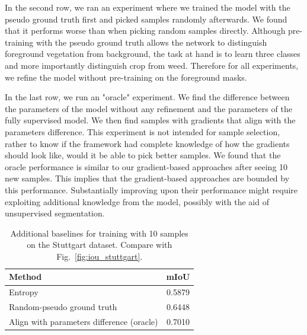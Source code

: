 \documentclass[letterpaper, 10 pt, conference]{ieeeconf}  %
\def\figref#1{Fig.~\ref{#1}}
\newcommand\todo[1]{\textbf{[TODO: #1}]}
\begin{document}

In the second row, we ran an experiment where we trained the model with the pseudo ground truth first and picked samples randomly afterwards. We found that it performs worse than when picking random samples directly. Although pre-training with the pseudo ground truth allows the network to distinguish foreground vegetation from background, the task at hand is to learn three classes and more importantly distinguish crop from weed. Therefore for all experiments, we refine the model without pre-training on the foreground masks.

In the last row, we run an "oracle" experiment. We find the difference between the parameters of the model without any refinement and the parameters of the fully supervised model. We then find samples with gradients that align with the parameters difference. This experiment is not intended for sample selection, rather to know if the framework had complete knowledge of how the gradients should look like, would it be able to pick better samples. We found that the oracle performance is similar to our gradient-based approaches after seeing 10 new samples.  %
This implies that the gradient-based approaches are bounded by this performance. Substantially improving upon their performance might require exploiting additional knowledge from the model, possibly with the aid of unsupervised segmentation. 


        \begin{table}
           \vspace{1em}
        \centering
        \caption{Additional baselines for training with 10 samples on the Stuttgart dataset. Compare with \figref{fig:iou_stuttgart}.}
        \begin{tabular}{@{}lc@{}} 
            \toprule
            Method  & mIoU \\ 
            \midrule 
             Entropy~\cite{chakraborty2015active, zhou2017fine} & 0.5879   \\ \addlinespace
    		  Random-pseudo ground truth   & 0.6448  \\ \addlinespace
    		  Align with parameters difference (oracle)  & 0.7010  \\  
            \bottomrule
        \end{tabular}
        \label{tab:add_baselines}
    \end{table}
    
\end{document}
